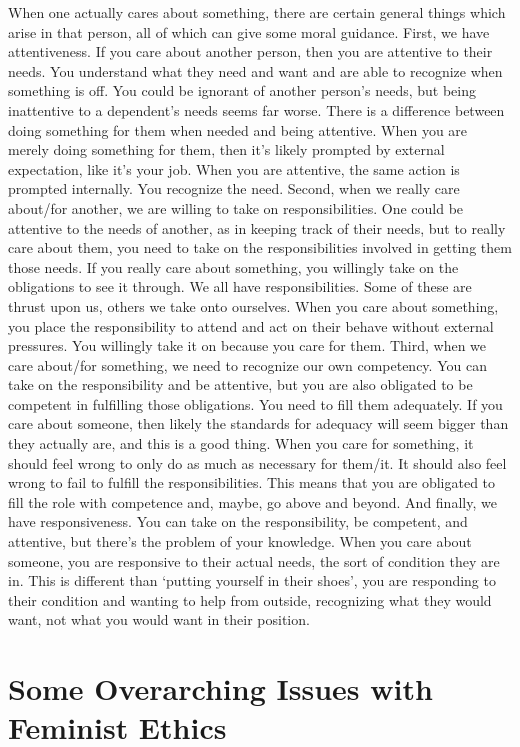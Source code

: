 When one actually cares about something, there are certain general things which arise in that person, all of which can give some moral guidance. First, we have attentiveness. If you care about another person, then you are attentive to their needs. You understand what they need and want and are able to recognize when something is off. You could be ignorant of another person’s needs, but being inattentive to a dependent's needs seems far worse. There is a difference between doing something for them when needed and being attentive. When you are merely doing something for them, then it’s likely prompted by external expectation, like it’s your job. When you are attentive, the same action is prompted internally. You recognize the need. Second, when we really care about/for another, we are willing to take on responsibilities. One could be attentive to the needs of another, as in keeping track of their needs, but to really care about them, you need to take on the responsibilities involved in getting them those needs. If you really care about something, you willingly take on the obligations to see it through. We all have responsibilities. Some of these are thrust upon us, others we take onto ourselves. When you care about something, you place the responsibility to attend and act on their behave without external pressures. You willingly take it on because you care for them. Third, when we care about/for something, we need to recognize our own competency. You can take on the responsibility and be attentive, but you are also obligated to be competent in fulfilling those obligations. You need to fill them adequately. If you care about someone, then likely the standards for adequacy will seem bigger than they actually are, and this is a good thing. When you care for something, it should feel wrong to only do as much as necessary for them/it. It should also feel wrong to fail to fulfill the responsibilities. This means that you are obligated to fill the role with competence and, maybe, go above and beyond. And finally, we have responsiveness. You can take on the responsibility, be competent, and attentive, but there’s the problem of your knowledge. When you care about someone, you are responsive to their actual needs, the sort of condition they are in. This is different than ‘putting yourself in their shoes’, you are responding to their condition and wanting to help from outside, recognizing what they would want, not what you would want in their position.

\section{Some Overarching Issues with Feminist Ethics}

